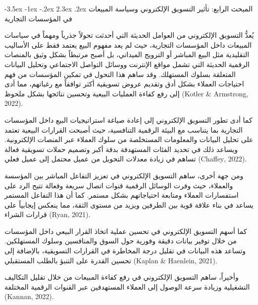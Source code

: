 \documentclass[12pt, a4paper]{report}
\makeatletter
\newcommand{\lr}[1]{\textenglish{#1}}
\renewcommand\section{\@startsection{section}{1}{\z@}%
  {-3.5ex \@plus -1ex \@minus -.2ex}%
  {2.3ex \@plus .2ex}%
  {\normalfont\Large\bfseries\color{primaryblue}}}
\makeatother
\begin{document}
\section{المبحث الرابع: تأثير التسويق الإلكتروني وسياسة المبيعات في المؤسسات التجارية}

يُعدُّ التسويق الإلكتروني من العوامل الحديثة التي أحدثت تحولاً جذرياً ومهماً في سياسات المبيعات داخل المؤسسات التجارية، حيث لم يعد مفهوم البيع يعتمد فقط على الأساليب التقليدية مثل البيع المباشر أو الترويج الميداني، بل أصبح مرتبطاً بشكل وثيق بالمنصات الرقمية الحديثة التي تشمل مواقع الإنترنت ووسائل التواصل الاجتماعي وتحليل البيانات المتعلقة بسلوك المستهلك. وقد ساهم هذا التحول في تمكين المؤسسات من فهم احتياجات العملاء بشكل أدق وتقديم عروض تسويقية أكثر توافقاً مع رغباتهم، مما أدى إلى رفع كفاءة العمليات البيعية وتحسين نتائجها بشكل ملحوظ (\lr{Kotler \& Armstrong}, 2022).

كما أدى تطور التسويق الإلكتروني إلى إعادة صياغة استراتيجيات البيع داخل المؤسسات التجارية بما يتناسب مع البيئة الرقمية التنافسية، حيث أصبحت القرارات البيعية تعتمد على تحليل البيانات والمعلومات المستخلصة من سلوك العملاء عبر المنصات الإلكترونية. ويساعد ذلك في تحديد الفئات المستهدفة بدقة أكبر وتصميم حملات تسويقية فعالة تساهم في زيادة معدلات التحويل من عميل محتمل إلى عميل فعلي (\lr{Chaffey}, 2022).

ومن جهة أخرى، ساهم التسويق الإلكتروني في تعزيز التفاعل المباشر بين المؤسسة والعملاء، حيث وفرت الوسائل الرقمية قنوات اتصال سريعة وفعالة تتيح الرد على استفسارات العملاء ومتابعة احتياجاتهم بشكل مستمر. كما أن هذا التفاعل المستمر يساعد في بناء علاقة قوية بين الطرفين ويزيد من مستوى الثقة، مما ينعكس إيجابياً على قرارات الشراء (\lr{Ryan}, 2021).

كما أسهم التسويق الإلكتروني في تحسين عملية اتخاذ القرار البيعي داخل المؤسسات من خلال توفير بيانات دقيقة وفورية حول السوق والمنافسين وسلوك المستهلكين. وتساعد هذه البيانات في تقليل درجة المخاطرة في القرارات التسويقية، بالإضافة إلى تحسين القدرة على التنبؤ بالطلب المستقبلي (\lr{Kaplan \& Haenlein}, 2021).

وأخيراً، ساهم التسويق الإلكتروني في رفع كفاءة المبيعات من خلال تقليل التكاليف التشغيلية وزيادة سرعة الوصول إلى العملاء المستهدفين عبر القنوات الرقمية المختلفة (\lr{Kannan}, 2022).
\end{document}
